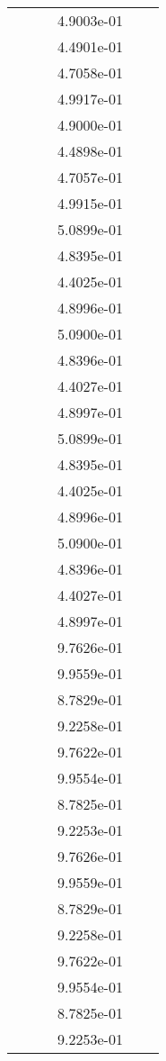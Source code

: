 \begin{xltabular}{\textwidth}{r|rS[table-format=1.3e+2]S[table-format=1.4e+2]S[table-format=1.4e+2]S[table-format=-1.5]}
&  &  & 4.9003e-01 & & \\
&  &  & 4.4901e-01 & & \\
&  &  & 4.7058e-01 & & \\
&  &  & 4.9917e-01 & & \\
&  &  & 4.9000e-01 & & \\
&  &  & 4.4898e-01 & & \\
&  &  & 4.7057e-01 & & \\
&  &  & 4.9915e-01 & & \\
&  &  & 5.0899e-01 & & \\
&  &  & 4.8395e-01 & & \\
&  &  & 4.4025e-01 & & \\
&  &  & 4.8996e-01 & & \\
&  &  & 5.0900e-01 & & \\
&  &  & 4.8396e-01 & & \\
&  &  & 4.4027e-01 & & \\
&  &  & 4.8997e-01 & & \\
&  &  & 5.0899e-01 & & \\
&  &  & 4.8395e-01 & & \\
&  &  & 4.4025e-01 & & \\
&  &  & 4.8996e-01 & & \\
&  &  & 5.0900e-01 & & \\
&  &  & 4.8396e-01 & & \\
&  &  & 4.4027e-01 & & \\
&  &  & 4.8997e-01 & & \\
&  &  & 9.7626e-01 & & \\
&  &  & 9.9559e-01 & & \\
&  &  & 8.7829e-01 & & \\
&  &  & 9.2258e-01 & & \\
&  &  & 9.7622e-01 & & \\
&  &  & 9.9554e-01 & & \\
&  &  & 8.7825e-01 & & \\
&  &  & 9.2253e-01 & & \\
&  &  & 9.7626e-01 & & \\
&  &  & 9.9559e-01 & & \\
&  &  & 8.7829e-01 & & \\
&  &  & 9.2258e-01 & & \\
&  &  & 9.7622e-01 & & \\
&  &  & 9.9554e-01 & & \\
&  &  & 8.7825e-01 & & \\
&  &  & 9.2253e-01 & & \\

\end{xltabular}
